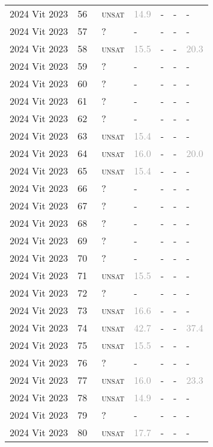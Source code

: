 \begin{center}
{\begin{longtable}{@{}lllllll@{}}
2024 Vit 2023 & 56 & ~\textsc{unsat} & \textcolor{darkgray}{14.9} & - & - & - \\
2024 Vit 2023 & 57 & ~? & - & - & - & - \\
2024 Vit 2023 & 58 & ~\textsc{unsat} & \textcolor{darkgray}{15.5} & - & - & \textcolor{darkgray}{20.3} \\
2024 Vit 2023 & 59 & ~? & - & - & - & - \\
2024 Vit 2023 & 60 & ~? & - & - & - & - \\
2024 Vit 2023 & 61 & ~? & - & - & - & - \\
2024 Vit 2023 & 62 & ~? & - & - & - & - \\
2024 Vit 2023 & 63 & ~\textsc{unsat} & \textcolor{darkgray}{15.4} & - & - & - \\
2024 Vit 2023 & 64 & ~\textsc{unsat} & \textcolor{darkgray}{16.0} & - & - & \textcolor{darkgray}{20.0} \\
2024 Vit 2023 & 65 & ~\textsc{unsat} & \textcolor{darkgray}{15.4} & - & - & - \\
2024 Vit 2023 & 66 & ~? & - & - & - & - \\
2024 Vit 2023 & 67 & ~? & - & - & - & - \\
2024 Vit 2023 & 68 & ~? & - & - & - & - \\
2024 Vit 2023 & 69 & ~? & - & - & - & - \\
2024 Vit 2023 & 70 & ~? & - & - & - & - \\
2024 Vit 2023 & 71 & ~\textsc{unsat} & \textcolor{darkgray}{15.5} & - & - & - \\
2024 Vit 2023 & 72 & ~? & - & - & - & - \\
2024 Vit 2023 & 73 & ~\textsc{unsat} & \textcolor{darkgray}{16.6} & - & - & - \\
2024 Vit 2023 & 74 & ~\textsc{unsat} & \textcolor{darkgray}{42.7} & - & - & \textcolor{darkgray}{37.4} \\
2024 Vit 2023 & 75 & ~\textsc{unsat} & \textcolor{darkgray}{15.5} & - & - & - \\
2024 Vit 2023 & 76 & ~? & - & - & - & - \\
2024 Vit 2023 & 77 & ~\textsc{unsat} & \textcolor{darkgray}{16.0} & - & - & \textcolor{darkgray}{23.3} \\
2024 Vit 2023 & 78 & ~\textsc{unsat} & \textcolor{darkgray}{14.9} & - & - & - \\
2024 Vit 2023 & 79 & ~? & - & - & - & - \\
2024 Vit 2023 & 80 & ~\textsc{unsat} & \textcolor{darkgray}{17.7} & - & - & - \\

\end{longtable}}
\end{center}
